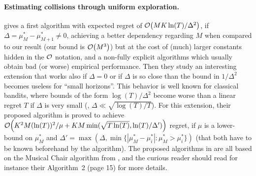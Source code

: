 \paragraph{Estimating collisions through uniform exploration.}
%
\cite{LugosiMehrabian18} gives a first algorithm with expected regret of $\mathop{}\mathopen{}\mathcal{O}\mathopen{}\left(M K \ln(T) / \Delta^2\right)$, if $\Delta = \mu^*_{M} - \mu^*_{M+1} \neq 0$, achieving a better dependency regarding $M$ when compared to our result (our bound is $\mathop{}\mathopen{}\mathcal{O}\mathopen{}\left(M^3\right)$) but at the cost of (much) larger constants hidden in the $\mathcal{O}$ notation, and a non-fully explicit algorithms which usually obtain bad (or worse) empirical performance.
Then they study an interesting extension that works also if $\Delta = 0$ or if $\Delta$ is so close than the bound in $1/\Delta^2$ becomes useless for ``small horizons''. This behavior is well known for classical bandits, where bounds of the form $\log(T)/\Delta^2$ become worse than a linear regret $T$ if $\Delta$ is very small (\ie, $\Delta\ll \sqrt{\log(T)/T}$).
For this extension, their proposed algorithm is proved to achieve $\mathop{}\mathopen{}\mathcal{O}\mathopen{}\left(K^2 M (\ln(T))^2 / \mu + K M \min(\sqrt{T \ln(T)}, \ln(T)/\Delta')\right)$ regret, if $\mu$ is a lower-bound on $\mu^*_{M}$ and $\Delta' = \max(\Delta, \min\{|\mu^*_M-\mu^*_i| : \mu^*_M > \mu^*_i \})$ (that both have to be known beforehand by the algorithm).
%
The proposed algorithms in \cite{LugosiMehrabian18} are all based on the Musical Chair algorithm from \cite{Rosenski16}, and the curious reader should read for instance their Algorithm~2 (page 15) for more details.

